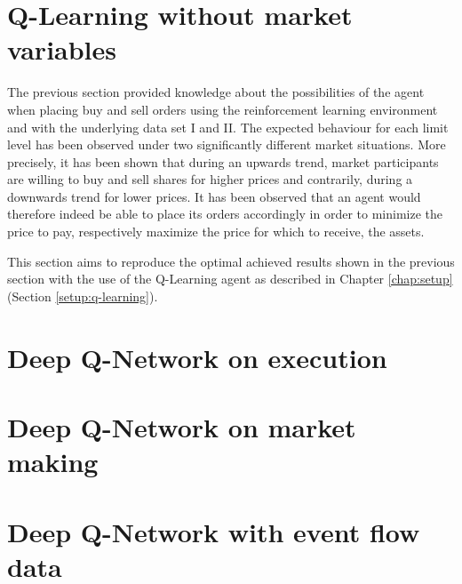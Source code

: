 \section{Q-Learning without market variables}
The previous section provided knowledge about the possibilities of the agent when placing buy and sell orders using the reinforcement learning environment and with the underlying data set I and II.
The expected behaviour for each limit level has been observed under two significantly different market situations.
More precisely, it has been shown that during an upwards trend, market participants are willing to buy and sell shares for higher prices and contrarily, during a downwards trend for lower prices.
It has been observed that an agent would therefore indeed be able to place its orders accordingly in order to minimize the price to pay, respectively maximize the price for which to receive, the assets.

This section aims to reproduce the optimal achieved results shown in the previous section with the use of the Q-Learning agent as described in Chapter \ref{chap:setup} (Section \ref{setup:q-learning}).


\section{Deep Q-Network on execution}

\section{Deep Q-Network on market making}

\section{Deep Q-Network with event flow data}
